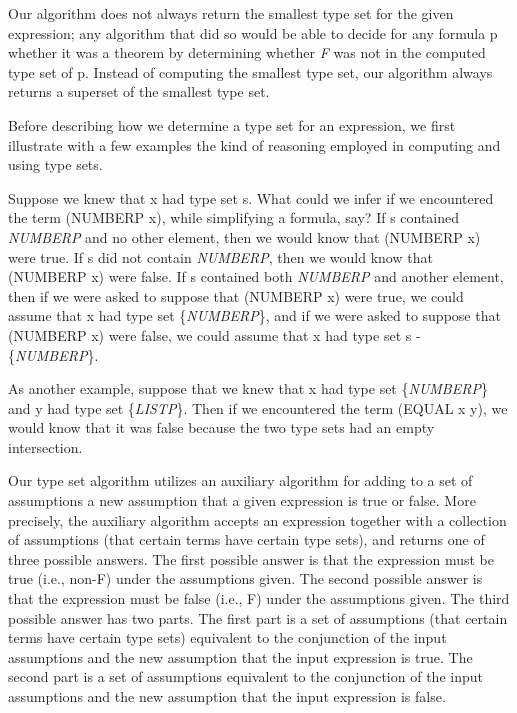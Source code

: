 \documentclass[11pt]{book}
\newcommand{\pubinlineunderline}[1]{\emph{#1}}
\begin{document}
Our algorithm does not always return the
smallest type set for the given expression; any
algorithm that did so would be able to decide for
any formula p whether it was a theorem by determining
whether  \pubinlineunderline{F} was not in the computed type set of p.
Instead of computing
the smallest type set, our algorithm always returns
a superset of the smallest type set.

Before describing how we determine a type set for an expression, we first illustrate with a
few examples the kind of reasoning employed in computing 
and using type sets.

Suppose we knew that x had type set s.  What could we
infer if we encountered the term (NUMBERP x), while simplifying a formula,
say?  If s contained \pubinlineunderline{NUMBERP} and no other element,
then we would know that (NUMBERP x) were true.  If s
did not contain \pubinlineunderline{NUMBERP}, then we would know that
(NUMBERP x) were false.  If s contained both \pubinlineunderline{NUMBERP}
and another element, then if we were asked to suppose that
(NUMBERP x) were true, we could assume that x had type set \{\pubinlineunderline{NUMBERP}\},
and if we were asked to
suppose that (NUMBERP x) were false, we could assume
that x had type set s - \{\pubinlineunderline{NUMBERP}\}.

As another example, suppose that we knew that x had
type set \{\pubinlineunderline{NUMBERP}\} and y had type set
\{\pubinlineunderline{LISTP}\}.  Then if we encountered the
term (EQUAL x y), we would know that it
was false because the two type sets had
an empty intersection.

Our type set algorithm utilizes an auxiliary algorithm
for adding to a set of assumptions
a new assumption that a given expression is true or false.
More precisely, the auxiliary algorithm accepts an
expression together with a collection of assumptions
(that certain terms have certain type sets), and
returns one of three possible answers.  The first possible answer
is that the expression must be true (i.e., non-F) under the
assumptions given.  The second possible answer is that
the expression must be false (i.e., F) under the assumptions given.
The third possible answer has two parts.  The first
part is a set of assumptions (that certain terms have
certain type sets) equivalent to the conjunction of the input assumptions
and the new assumption that the input expression
is true.  The second part is a set of assumptions
equivalent to the conjunction of the input assumptions and the new assumption that
the input expression is false.
\end{document}
